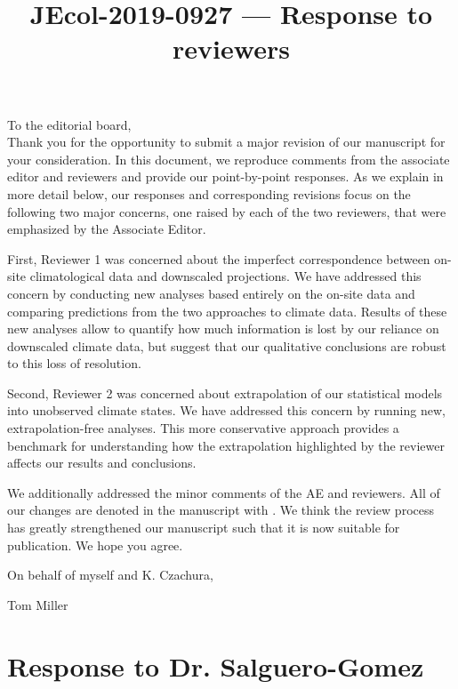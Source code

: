 \documentclass[12pt]{article}
\newcommand{\revise}[1]{{\color{Mahogany}{#1}}}
\begin{document}
\title{JEcol-2019-0927 --- Response to reviewers}

\maketitle
\noindent To the editorial board,\\

Thank you for the opportunity to submit a major revision of our manuscript for your consideration. 
In this document, we reproduce comments from the associate editor and reviewers and provide our point-by-point responses. As we explain in more detail below, our responses and corresponding revisions focus on the following two major concerns, one raised by each of the two reviewers, that were emphasized by the Associate Editor.

First, Reviewer 1 was concerned about the imperfect correspondence between on-site climatological data and downscaled projections. 
We have addressed this concern by conducting new analyses based entirely on the on-site data and comparing predictions from the two approaches to climate data.
Results of these new analyses allow to quantify how much information is lost by our reliance on downscaled climate data, but suggest that our qualitative conclusions are robust to this loss of resolution. 

Second, Reviewer 2 was concerned about extrapolation of our statistical models into unobserved climate states. 
We have addressed this concern by running new, extrapolation-free analyses.
This more conservative approach provides a benchmark for understanding how the extrapolation highlighted by the reviewer affects our results and conclusions. 

We additionally addressed the minor comments of the AE and reviewers. 
All of our changes are denoted in the manuscript with \revise{Mahogany font}.
We think the review process has greatly strengthened our manuscript such that it is now suitable for publication.
We hope you agree. 

\vspace{2em}
\hfill On behalf of myself and K. Czachura,

\hfill Tom Miller
\newpage



\section{Response to Dr. Salguero-Gomez}
\vspace{-2em}
\end{document}

